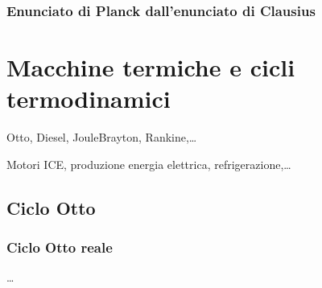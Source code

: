\documentclass[letterpaper,10pt,italian]{jupyterBook}
\begin{document}
\subsubsection*{Enunciato di Planck dall’enunciato di Clausius}

\sphinxstepscope


\section{Macchine termiche e cicli termodinamici}
\label{\detokenize{ch/thermodynamics/heat-engine-industrial:macchine-termiche-e-cicli-termodinamici}}\label{\detokenize{ch/thermodynamics/heat-engine-industrial:physics-hs-thermodynamics-heat-engine-industrial}}\label{\detokenize{ch/thermodynamics/heat-engine-industrial::doc}}
\sphinxAtStartPar
{}

\sphinxAtStartPar
{} Otto, Diesel, Joule\sphinxhyphen{}Brayton, Rankine,…

\sphinxAtStartPar
{} Motori ICE, produzione energia elettrica, refrigerazione,…

\sphinxstepscope


\subsection{Ciclo Otto}
\label{\detokenize{ch/thermodynamics/heat-engine-otto:ciclo-otto}}\label{\detokenize{ch/thermodynamics/heat-engine-otto:physics-hs-thermodynamics-heat-engine-otto}}\label{\detokenize{ch/thermodynamics/heat-engine-otto::doc}}
\sphinxAtStartPar
{}


\subsubsection{Ciclo Otto reale}
\label{\detokenize{ch/thermodynamics/heat-engine-otto:ciclo-otto-reale}}
\sphinxAtStartPar
…
\end{document}
